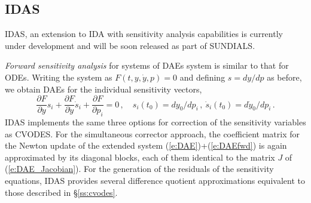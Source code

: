 
\subsection{IDAS}\label{ss:idas}

IDAS, an extension to IDA with sensitivity analysis capabilities is 
currently under development and will be soon released as part of SUNDIALS.

{\em Forward sensitivity analysis} for systems of DAEs system is similar to that 
for ODEs.  Writing the system as $F(t,y,\dot{y},p)=0$ and defining 
$s={dy}/{dp}$ as before, we obtain DAEs for the individual sensitivity vectors,
%
\begin{equation}\label{e:DAEfwd}
  \frac{\partial F}{\partial y} s_i + \frac{\partial F}{\partial \dot{y}} \dot{s}_i
  + \frac{\partial F}{\partial p_i}  = 0 \, , \quad
  s_i(t_0) = dy_0 / dp_i \, , ~ \dot{s}_i(t_0) = d\dot{y}_0 / dp_i \, .
\end{equation}
%
IDAS implements the same three options for correction of the sensitivity
variables as CVODES. For the simultaneous corrector approach, the coefficient
matrix for the Newton update of the extended system (\ref{e:DAE})+(\ref{e:DAEfwd})
is again approximated by its diagonal blocks, each of them identical to the
matrix $J$ of (\ref{e:DAE_Jacobian}). For the generation of the residuals of the sensitivity
equations, IDAS provides several difference quotient approximations equivalent 
to those described in \S\ref{ss:cvodes}.


